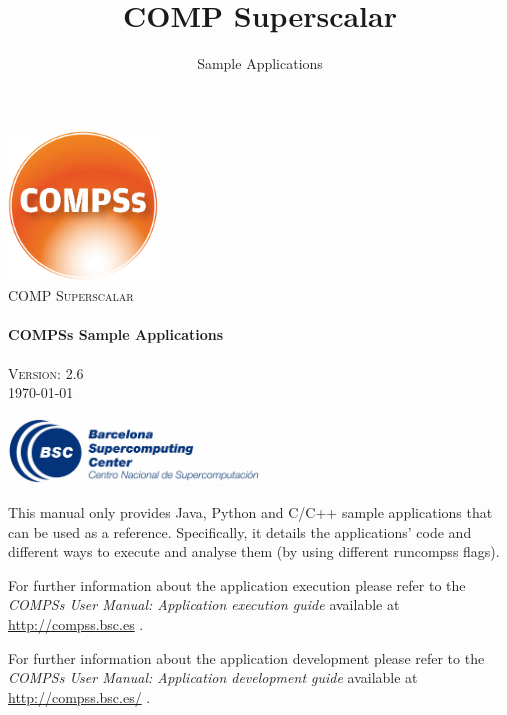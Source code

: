 \documentclass[a4paper,12pt]{article}
\title{COMP Superscalar}
\author{Sample Applications}
\def \compssversion {2.6}
\begin{document}
  \hypersetup{pageanchor=false}
  \begin{titlepage} 
    \begin{center} 
      \includegraphics[width=0.3\textwidth]{./Figures/Logos/degradado-naranja-compss.jpg}~\\[1cm] 
      \textsc{\LARGE COMP Superscalar}\\[1.5cm] 
      
      \HRule \\[0.4cm] 
      { \huge \bfseries COMPSs Sample Applications \\[0.4cm] }
      \HRule \\[1.5cm] 

      { \large \textsc{Version: \compssversion}} \\[0.3cm]
      { \large \today } 
      
      \vfill 
      \includegraphics[width=0.5\textwidth]{./Figures/bsc_280.jpg}~\\[1cm]
    \end{center} 
  \end{titlepage}
  \hypersetup{pageanchor=true}
  
  {
    This manual only provides Java, Python and C/C++ sample applications that can be used as a reference. Specifically, it details
    the applications' code and different ways to execute and analyse them (by using different runcompss flags).
    \newline

    For further information about the application execution please refer to the \textit{COMPSs User Manual: Application execution
    guide} available at \url{http://compss.bsc.es} .
    
    For further information about the application development please refer to the \textit{COMPSs User Manual: Application development
    guide} available at \url{http://compss.bsc.es/} .

  }
  
\end{document}
